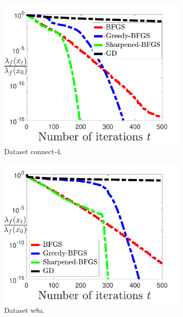 \documentclass[11pt]{article}
\numberwithin{assumption}{section}
\numberwithin{remark}{section}
\numberwithin{theorem}{section}
\begin{document}
\begin{figure}
\begin{subfigure}{0.32\textwidth}
    \includegraphics[width=\textwidth]{Figures/connect-4.pdf}
    \caption{Dataset connect-4.}
\end{subfigure}
\hfill
\begin{subfigure}{0.32\textwidth}
    \includegraphics[width=\textwidth]{Figures/w8a.pdf}
    \caption{Dataset w8a.}
\end{subfigure}
\begin{subfigure}{0.32\textwidth}

\end{subfigure}
\end{figure}
\end{document}
